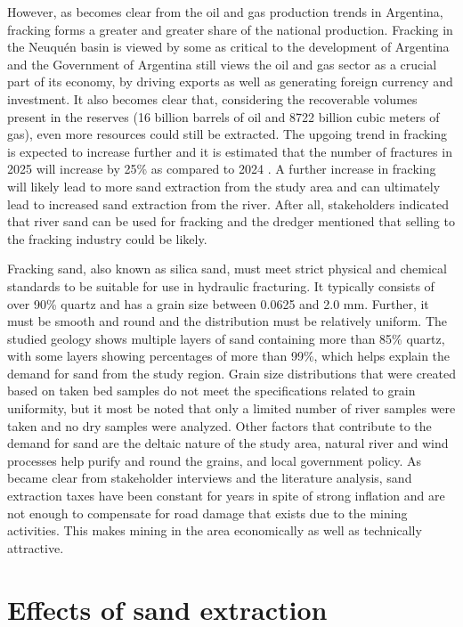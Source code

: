 However, as becomes clear from the oil and gas production trends in Argentina, fracking forms a greater and greater share of the national production. Fracking in the Neuquén basin is viewed by some as critical to the development of Argentina and the Government of Argentina still views the oil and gas sector as a crucial part of its economy, by driving exports as well as generating foreign currency and investment. It also becomes clear that, considering the recoverable volumes present in the reserves (16 billion barrels of oil and 8722 billion cubic meters of gas), even more resources could still be extracted. The upgoing trend in fracking is expected to increase further and it is estimated that the number of fractures in 2025 will increase by 25\% as compared to 2024 \autocite{barnedaFrackingVacaMuerta2025}. A further increase in fracking will likely lead to more sand extraction from the study area and can ultimately lead to increased sand extraction from the river. After all, stakeholders indicated that river sand can be used for fracking and the dredger mentioned that selling to the fracking industry could be likely.

Fracking sand, also known as silica sand, must meet strict physical and chemical standards to be suitable for use in hydraulic fracturing. It typically consists of over 90\% quartz and has a grain size between 0.0625 and 2.0 mm. Further, it must be smooth and round and the distribution must be relatively uniform. The studied geology shows multiple layers of sand containing more than 85\% quartz, with some layers showing percentages of more than 99\%, which helps explain the demand for sand from the study region. Grain size distributions that were created based on taken bed samples do not meet the specifications related to grain uniformity, but it most be noted that only a limited number of river samples were taken and no dry samples were analyzed. Other factors that contribute to the demand for sand are the deltaic nature of the study area, natural river and wind processes help purify and round the grains, and local government policy. As became clear from stakeholder interviews and the literature analysis, sand extraction taxes have been constant for years in spite of strong inflation and are not enough to compensate for road damage that exists due to the mining activities. This makes mining in the area economically as well as technically attractive.

\section{Effects of sand extraction}

